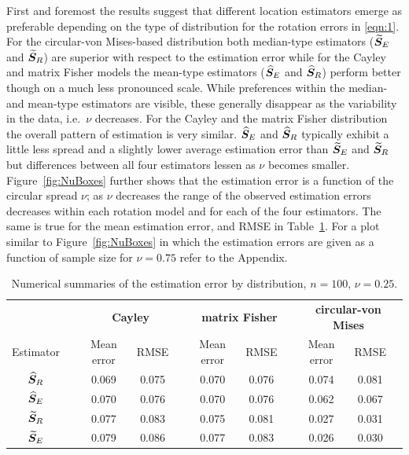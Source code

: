 First and foremost the results suggest that different location estimators emerge as preferable depending on the type of distribution for the rotation errors in \eqref{eqn:1}.  For the circular-von Mises-based distribution both median-type estimators (${\widetilde{\bm S}_E}$ and ${\widetilde{\bm S}_R}$) are superior with respect to the estimation error while for the Cayley and matrix Fisher models the mean-type estimators (${\widehat{\bm S}_E}$ and ${\widehat{\bm S}_R}$) perform better though on a much less pronounced scale. While preferences within the median- and mean-type estimators are visible, these generally disappear as the variability in the data, i.e.~$\nu$ decreases.    
For the Cayley and the matrix Fisher distribution the overall pattern of estimation is very similar. ${\widehat{\bm S}_E}$ and ${\widehat{\bm S}_R}$ typically exhibit a little less spread and a slightly lower average estimation error than ${\widetilde{\bm S}_E}$ and ${\widetilde{\bm S}_R}$ but differences between all four estimators lessen as $\nu$ becomes smaller. Figure~\ref{fig:NuBoxes} further shows that the estimation error is a function of the circular spread $\nu$; as $\nu$ decreases the range of the observed estimation errors decreases within each rotation model and for each of the four estimators. The same is true for the mean estimation error, and RMSE in Table~\ref{tab:alldN100Nu25}.  For a plot similar to Figure~\ref{fig:NuBoxes} in which the estimation errors are given as a function of sample size for $\nu=0.75$ refer to the Appendix.

\begin{center}
\begin{table}[h!]
\caption{Numerical summaries of the estimation error  by distribution, $n=100$,  $\nu=0.25$.  \label{tab:alldN100Nu25}}
\begin{tabular}{ccccccccccc}
  \hline
		& &\multicolumn{3}{c}{\textbf{Cayley}} & \multicolumn{3}{c}{\textbf{matrix Fisher}}  & \multicolumn{3}{c}{\textbf{circular-von Mises}}\\ 
Estimator 	& &  Mean error & RMSE& &  Mean error & RMSE& &   Mean error & RMSE \\  \hline \hline %
 		  ${\widehat{\bm S}_R}$ & &  0.069 & 0.075 & &  0.070 & 0.076&  & 0.074 & 0.081 \\ 
 		 ${\widehat{\bm S}_E}$ &  & 0.070 & 0.076 & &  0.070 & 0.076&  &  0.062 & 0.067\\ 
		 ${\widetilde{\bm S}_R}$ &  & 0.077 & 0.083 & &  0.075 & 0.081&  & 0.027 & 0.031\\ 
 		  ${\widetilde{\bm S}_E}$ &  & 0.079 & 0.086 & &  0.077 & 0.083 & & 0.026 & 0.030\\ \hline
\end{tabular}
\end{table}
\end{center}

